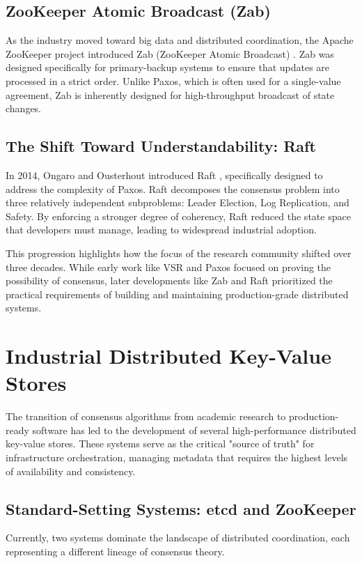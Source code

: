 \subsection{ZooKeeper Atomic Broadcast (Zab)}
As the industry moved toward big data and distributed coordination, the Apache ZooKeeper project introduced Zab (ZooKeeper Atomic Broadcast) \cite{Zab2011}.
Zab was designed specifically for primary-backup systems to ensure that updates are processed in a strict order.
Unlike Paxos, which is often used for a single-value agreement, Zab is inherently designed for high-throughput broadcast of state changes.

\subsection{The Shift Toward Understandability: Raft}
In 2014, Ongaro and Ousterhout introduced Raft \cite{Raft2014}, specifically designed to address the complexity of Paxos.
Raft decomposes the consensus problem into three relatively independent subproblems: Leader Election, Log Replication, and Safety.
By enforcing a stronger degree of coherency, Raft reduced the state space that developers must manage, leading to widespread industrial adoption.

This progression highlights how the focus of the research community shifted over three decades.
While early work like VSR and Paxos focused on proving the possibility of consensus, later developments like Zab and Raft prioritized the practical requirements of building and maintaining production-grade distributed systems.

\section{Industrial Distributed Key-Value Stores}
The transition of consensus algorithms from academic research to production-ready software has led to the development of several high-performance distributed key-value stores. These systems serve as the critical "source of truth" for infrastructure orchestration, managing metadata that requires the highest levels of availability and consistency. 

\subsection{Standard-Setting Systems: etcd and ZooKeeper}
Currently, two systems dominate the landscape of distributed coordination, each representing a different lineage of consensus theory.

